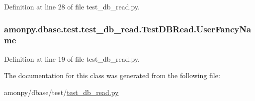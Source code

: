 Definition at line 28 of file test\-\_\-db\-\_\-read.\-py.

\hypertarget{classamonpy_1_1dbase_1_1test_1_1test__db__read_1_1_test_d_b_read_a9ed55e19e8187469a496695884509101}{
\subsubsection[{User\-Fancy\-Name}]{\setlength{\rightskip}{0pt plus 5cm}amonpy.\-dbase.\-test.\-test\-\_\-db\-\_\-read.\-Test\-D\-B\-Read.\-User\-Fancy\-Name}}\label{classamonpy_1_1dbase_1_1test_1_1test__db__read_1_1_test_d_b_read_a9ed55e19e8187469a496695884509101}


Definition at line 19 of file test\-\_\-db\-\_\-read.\-py.



The documentation for this class was generated from the following file\-:\begin{DoxyCompactItemize}
\item 
amonpy/dbase/test/\hyperlink{test__db__read_8py}{test\-\_\-db\-\_\-read.\-py}\end{DoxyCompactItemize}
